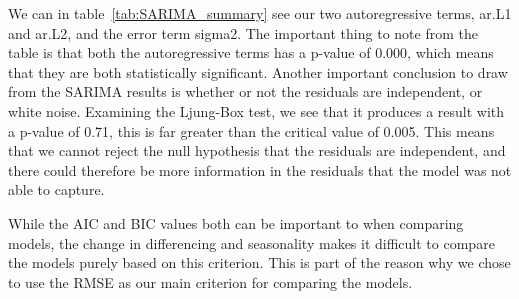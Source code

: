We can in table~\ref{tab:SARIMA_summary} see our two autoregressive terms, ar.L1 and ar.L2, and the error term sigma2. The important thing to note from the table is that both the autoregressive terms has a p-value of 0.000, which means that they are both statistically significant. Another important conclusion to draw from the SARIMA results is whether or not the residuals are independent, or white noise. Examining the Ljung-Box test, we see that it produces a result with a p-value of 0.71, this is far greater than the critical value of 0.005. This means that we cannot reject the null hypothesis that the residuals are independent, and there could therefore be more information in the residuals that the model was not able to capture. 

While the AIC and BIC values both can be important to when comparing models, the change in differencing and seasonality makes it difficult to compare the models purely based on this criterion. This is part of the reason why we chose to use the RMSE as our main criterion for comparing the models.
